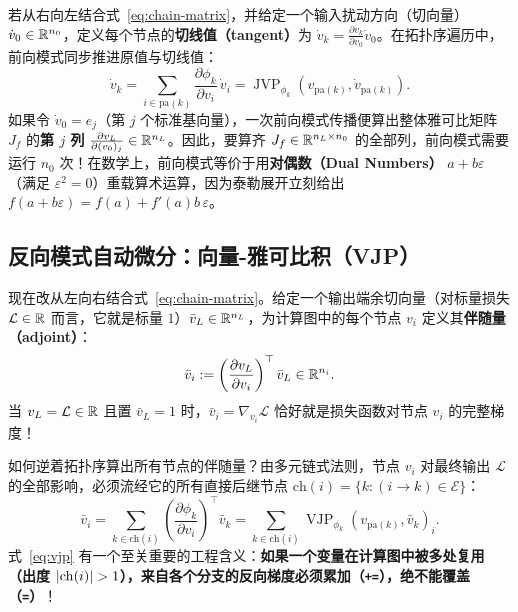 若从右向左结合式~\eqref{eq:chain-matrix}，并给定一个输入扰动方向（切向量）$\dot{v}_0 \in \mathbb{R}^{n_0}$，定义每个节点的\textbf{切线值（tangent）}为 $\dot{v}_k = \frac{\partial v_k}{\partial v_0} \dot{v}_0$。在拓扑序遍历中，前向模式同步推进原值与切线值：
\begin{equation}
  \dot{v}_k = \sum_{i \in \mathrm{pa}(k)} \frac{\partial \phi_k}{\partial v_i}\,\dot{v}_i = \operatorname{JVP}_{\phi_k}(v_{\mathrm{pa}(k)}, \dot{v}_{\mathrm{pa}(k)}).
  \label{eq:jvp}
\end{equation}
如果令 $\dot{v}_0 = e_j$（第 $j$ 个标准基向量），一次前向模式传播便算出整体雅可比矩阵 $J_f$ 的\textbf{第 $j$ 列} $\frac{\partial v_L}{\partial (v_0)_j} \in \mathbb{R}^{n_L}$。因此，要算齐 $J_f \in \mathbb{R}^{n_L \times n_0}$ 的全部列，前向模式需要运行 $n_0$ 次！在数学上，前向模式等价于用\textbf{对偶数（Dual Numbers）} $a + b\varepsilon$（满足 $\varepsilon^2 = 0$）重载算术运算，因为泰勒展开立刻给出 $f(a + b\varepsilon) = f(a) + f'(a)b\,\varepsilon$。

\subsection{反向模式自动微分：向量-雅可比积（VJP）}

现在改从左向右结合式~\eqref{eq:chain-matrix}。给定一个输出端余切向量（对标量损失 $\mathcal{L} \in \mathbb{R}$ 而言，它就是标量 $1$）$\bar{v}_L \in \mathbb{R}^{n_L}$，为计算图中的每个节点 $v_i$ 定义其\textbf{伴随量（adjoint）}：
\[
  \bar{v}_i := \left(\frac{\partial v_L}{\partial v_i}\right)^\top \bar{v}_L \in \mathbb{R}^{n_i}.
\]
当 $v_L = \mathcal{L} \in \mathbb{R}$ 且置 $\bar{v}_L = 1$ 时，$\bar{v}_i = \nabla_{v_i} \mathcal{L}$ 恰好就是损失函数对节点 $v_i$ 的完整梯度！

如何逆着拓扑序算出所有节点的伴随量？由多元链式法则，节点 $v_i$ 对最终输出 $\mathcal{L}$ 的全部影响，必须流经它的所有直接后继节点 $\mathrm{ch}(i) = \{k : (i \to k) \in \mathcal{E}\}$：
\begin{equation}
  \bar{v}_i = \sum_{k \in \mathrm{ch}(i)} \left(\frac{\partial \phi_k}{\partial v_i}\right)^\top \bar{v}_k = \sum_{k \in \mathrm{ch}(i)} \operatorname{VJP}_{\phi_k}(v_{\mathrm{pa}(k)}, \bar{v}_k)_i.
  \label{eq:vjp}
\end{equation}
式~\eqref{eq:vjp} 有一个至关重要的工程含义：\textbf{如果一个变量在计算图中被多处复用（出度 $\left|\mathrm{ch}(i)\right| > 1$），来自各个分支的反向梯度必须累加（\texttt{+=}），绝不能覆盖（\texttt{=}）}！


